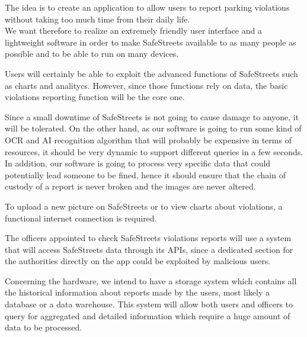 \setlength{\parskip}{1em}
The idea is to create an application to allow users to report parking violations without taking too much time from their daily life.
\\We want therefore to realize an extremely friendly user interface and a lightweight software in order to make SafeStreets available to as many people as possible and to be able to run on many devices.

Users will certainly be able to exploit the advanced functions of SafeStreets such as charts and analitycs. However, since those functions rely on data, the basic violations reporting function will be the core one.

Since a small downtime of SafeStreets is not going to cause damage to anyone, it will be tolerated. On the other hand, as our software is going to run some kind of OCR and AI recognition algorithm that will probably be expensive in terms of resources, it should be very dynamic to support different queries in a few seconds.
\\In addition, our software is going to process very specific data that could potentially lead someone to be fined, hence it should ensure that the chain of custody of a report is never broken and the images are never altered.

To upload a new picture on SafeStreets or to view charts about violations, a functional internet connection is required.

The officers appointed to check SafeStreets violations reports will use a system that will access SafeStreets data through its APIs, since a dedicated section for the authorities directly on the app could be exploited by malicious users.

Concerning the hardware, we intend to have a storage system which contains all the historical information about reports made by the users, most likely a database or a data warehouse. This system will allow both users and officers to query for aggregated and detailed information which require a huge amount of data to be processed.
\clearpage